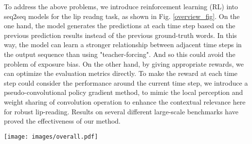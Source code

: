 \documentclass[a4paper, 10pt, conference]{ieeeconf}      %
\begin{document}
To address the above problems, we introduce reinforcement learning (RL) into seq2seq models for the lip readng task, as shown in Fig. \ref{overview_fig}. 
On the one hand, the model generates the predictions at each time step based on the previous prediction results instead of the previous ground-truth words. In this way, the model can learn a stronger relationship between adjacent time steps in the output sequence than using "teacher-forcing". And so this could avoid the problem of exposure bias. 
On the other hand, by giving appropriate rewards, we can optimize the evaluation metrics directly. To make the reward at each time step could  consider the performance around the current time step, we introduce a pseudo-convolutional policy gradient method, to mimic the local perception and weight sharing of convolution operation to enhance the contextual relevance here for robust lip-reading. Results on several different large-scale benchmarks have proved the effectiveness of our method. 


\begin{figure*}[htb]
	\setlength{\abovecaptionskip}{0.2cm}
	\setlength{\belowcaptionskip}{-0.3cm} 
	\centering
	\texttt{[image: images/overall.pdf]}
	\caption{Overview of our proposed PCPG based seq2seq model for lip-reading. In the model, the GRU decoder is regarded as an agent. And the ground truth is regarded as the environment. In the learning process, the agent would observe the old state generated from the previous time steps, and then takes an action to output a character/word at each current time-step to obtain a new state. The new state, the old state and the environment would together contribute to the reward for the action. Finally, the reward is feeded to the PCPG to generate the final loss when passed to the agent.}\label{overview_fig}
\end{figure*}
\end{document}
